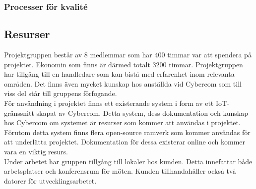 \subsubsection*{Processer för kvalité}


\subsection{Resurser}
Projektgruppen består av 8 medlemmar som har 400 timmar var att spendera på projektet. Ekonomin som finns är därmed totalt 3200 timmar. Projektgruppen har tillgång till en handledare som kan bistå med erfarenhet inom relevanta områden. Det finns även mycket kunskap hos anställda vid Cybercom som till viss del står till gruppens förfogande.\\

För användning i projektet finns ett existerande system i form av ett IoT-gränssnitt skapat av Cybercom. Detta system, dess dokumentation och kunskap hos Cybercom om systemet är resurser som kommer att användas i projektet. Förutom detta system finns flera open-source ramverk som kommer användas för att underlätta projektet. Dokumentation för dessa existerar online och kommer vara en viktig resurs.\\

Under arbetet har gruppen tillgång till lokaler hos kunden. Detta innefattar både arbetsplatser och konferensrum för möten. Kunden tillhandahåller också två datorer för utvecklingsarbetet. \\

\pagebreak
